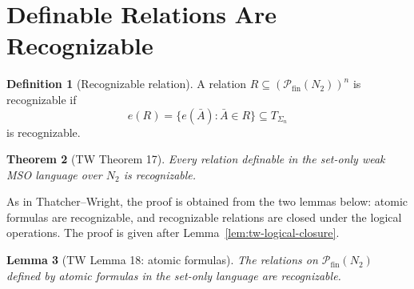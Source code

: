 \documentclass[11pt]{article}
\newtheorem{theorem}{Theorem}
\newtheorem{lemma}[theorem]{Lemma}
\theoremstyle{definition}
\newtheorem{definition}[theorem]{Definition}
\newcommand{\TW}{Thatcher--Wright}
\newcommand{\powfin}{\mathcal P_{\mathrm{fin}}}
\newcommand{\Term}[1]{T_{#1}}
\begin{document}
\section{Definable Relations Are Recognizable}

\begin{definition}[Recognizable relation]
A relation \(R\subseteq(\powfin(N_2))^n\) is recognizable if
\[
  e(R)=\{e(\bar A):\bar A\in R\}
  \subseteq\Term{\Sigma_n}
\]
is recognizable.
\end{definition}

\begin{theorem}[TW Theorem 17]\label{thm:tw-definable-recognizable}
Every relation definable in the set-only weak MSO language over \(N_2\) is
recognizable.
\end{theorem}

\noindent
As in \TW{}, the proof is obtained from the two lemmas below: atomic formulas
are recognizable, and recognizable relations are closed under the logical
operations.  The proof is given after Lemma~\ref{lem:tw-logical-closure}.

\begin{lemma}[TW Lemma 18: atomic formulas]\label{lem:tw-atomic}
The relations on \(\powfin(N_2)\) defined by atomic formulas in the set-only
language are recognizable.
\end{lemma}
\end{document}
